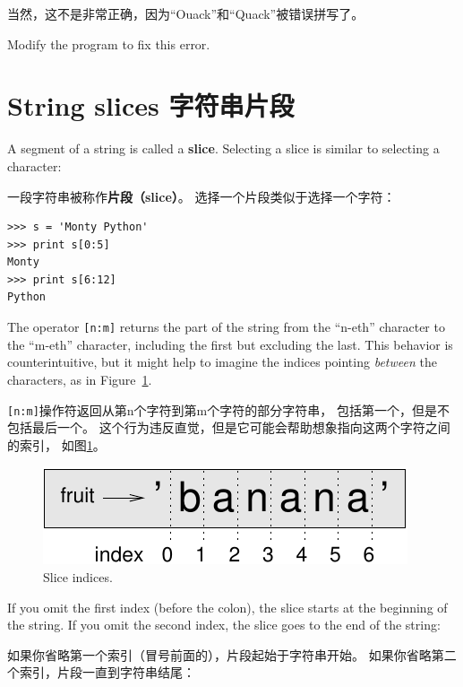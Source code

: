 \documentclass[10pt]{book}
\begin{document}
\begin{CJK}{UTF8}{gbsn}
当然，这不是非常正确，因为``Ouack''和``Quack''被错误拼写了。

\begin{exercise}

Modify the program to fix this error.

\end{exercise}



\section{String slices 字符串片段}
\label{slice}

A segment of a string is called a {\bf slice}.  Selecting a slice is
similar to selecting a character:

一段字符串被称作{\bf 片段（slice）}。
选择一个片段类似于选择一个字符：

\begin{verbatim}
>>> s = 'Monty Python'
>>> print s[0:5]
Monty
>>> print s[6:12]
Python
\end{verbatim}
%
The operator {\tt [n:m]} returns the part of the string from the 
``n-eth'' character to the ``m-eth'' character, including the first but
excluding the last.  This behavior is counterintuitive, but it might
help to imagine the indices pointing {\em between} the
characters, as in Figure~\ref{fig.banana}.

{\tt [n:m]}操作符返回从第n个字符到第m个字符的部分字符串，
包括第一个，但是不包括最后一个。
这个行为违反直觉，但是它可能会帮助想象指向这两个字符之间的索引，
如图\ref{fig.banana}。

\begin{figure}
\centerline
{\includegraphics[scale=0.8]{figs/banana.pdf}}
\caption{Slice indices.}
\label{fig.banana}
\end{figure}


If you omit the first index (before the colon), the slice starts at
the beginning of the string.  If you omit the second index, the slice
goes to the end of the string:

如果你省略第一个索引（冒号前面的），片段起始于字符串开始。
如果你省略第二个索引，片段一直到字符串结尾：


\end{CJK}
\end{document}

